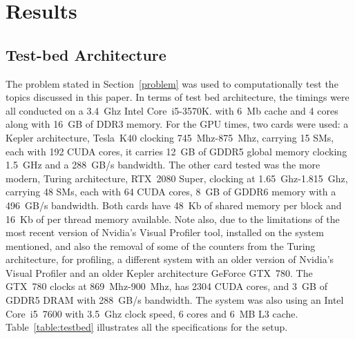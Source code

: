 \clearpage
\chapter{Results}

\section{Test-bed Architecture}

The problem stated in Section~\ref{problem} was used to computationally test the topics discussed in this paper. In terms of test bed architecture, the timings were all conducted on a 3.4~Ghz Intel Core~i5-3570K. with 6~Mb cache and 4 cores along with 16~GB of DDR3 memory. For the GPU times, two cards were used: a Kepler architecture, Tesla~K40 clocking 745~Mhz-875~Mhz, carrying 15 SMs, each with 192 CUDA cores, it carries 12~GB of GDDR5 global memory clocking 1.5~GHz and a 288~GB/s bandwidth. The other card tested was the more modern, Turing architecture, RTX~2080 Super, clocking at 1.65~Ghz-1.815~Ghz, carrying 48 SMs, each with 64 CUDA cores, 8~GB of GDDR6 memory with a 496~GB/s bandwidth. Both cards have 48~Kb of shared memory per block and 16~Kb of per thread memory available. Note also, due to the limitations of the most recent version of Nvidia's Visual Profiler tool, installed on the system mentioned, and also the removal of some of the counters from the Turing architecture, for profiling, a different system with an older version of Nvidia's Visual Profiler and an older Kepler architecture GeForce GTX~780. The GTX~780 clocks at 869~Mhz-900~Mhz, has 2304 CUDA cores, and 3~GB of GDDR5 DRAM with 288~GB/s bandwidth. The system was also using an Intel Core~i5~7600 with 3.5~Ghz clock speed, 6 cores and 6~MB L3 cache. Table~\ref{table:testbed} illustrates all the specifications for the setup.
\begin{table}
    \begin{center}
    \caption{Testbed architecture.}
	\label{table:testbed}
	\end{center}
\end{table}
